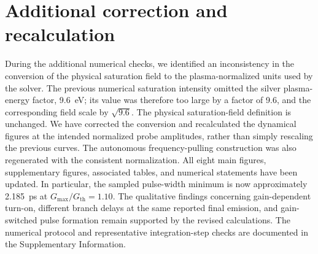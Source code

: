 \documentclass[11pt,a4paper]{article}
\begin{document}
\section*{Additional correction and recalculation}
During the additional numerical checks, we identified an inconsistency in the conversion of the physical saturation field to the plasma-normalized units used by the solver. The previous numerical saturation intensity omitted the silver plasma-energy factor, 9.6~eV; its value was therefore too large by a factor of 9.6, and the corresponding field scale by $\sqrt{9.6}$. The physical saturation-field definition is unchanged. We have corrected the conversion and recalculated the dynamical figures at the intended normalized probe amplitudes, rather than simply rescaling the previous curves. The autonomous frequency-pulling construction was also regenerated with the consistent normalization. All eight main figures, supplementary figures, associated tables, and numerical statements have been updated. In particular, the sampled pulse-width minimum is now approximately 2.185~ps at $G_{\max}/G_{\mathrm{th}}=1.10$. The qualitative findings concerning gain-dependent turn-on, different branch delays at the same reported final emission, and gain-switched pulse formation remain supported by the revised calculations. The numerical protocol and representative integration-step checks are documented in the Supplementary Information.
\end{document}
